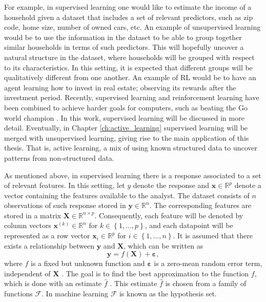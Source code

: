 For example, in supervised learning one would like to estimate the income of a household given a dataset that includes a set of relevant predictors, such as zip code, home size, number of owned cars, etc.
An example of unsupervised learning would be to use the information in the dataset to be able to group together similar households in terms of such predictors. This will hopefully uncover a natural structure in the dataset, where households will be grouped with respect to its characteristics. In this setting, it is expected that different groups will be qualitatively different from one another.
An example of RL would be to have an agent learning how to invest in real estate; observing its rewards after the investment period.
Recently, supervised learning and reinforcement learning have been combined to achieve harder goals for computers, such as beating the Go world champion \cite{silver2017mastering}.
In this work, supervised learning will be discussed in more detail. Eventually, in Chapter \ref{ch:active_learning} supervised learning will be merged with unsupervised learning, giving rise to the main application of this thesis. That is, active learning, a mix of using known structured data to uncover patterns from non-structured data.

As mentioned above, in supervised learning there is a response associated to a set of relevant features. In this setting, let $y$ denote the response
and $\boldsymbol{x} \in \mathbb{R}^p$ denote a vector containing the features available to the analyst. The dataset consists of $n$ observations of such response stored in $\boldsymbol{y} \in \mathbb{R}^n$.
The corresponding features are stored in a matrix $\boldsymbol{X} \in \mathbb{R}^{n \times p}$. Consequently, each feature will be denoted by column vectors $\boldsymbol{x}^{(k)} \in \mathbb{R}^n$ for $k \in \left\{1, \hdots, p \right\}$, and each datapoint will be represented as a row vector $\boldsymbol{x}_i \in \mathbb{R}^p$ for $i \in \left\{1, \hdots, n \right\}$.
It is assumed that there exists a relationship between $\boldsymbol{y}$ and $\boldsymbol{X}$, which can be written as
\begin{equation}
  \label{eq:general_learning_model}
  \boldsymbol{y} = f(\boldsymbol{X}) + \boldsymbol{\varepsilon},
\end{equation}
where $f$ is a fixed but unknown function and $\boldsymbol{\varepsilon}$ is a zero-mean random error term, independent of $\boldsymbol{X}$ \cite[p.~16]{james2013introduction}.
The goal is to find the best approximation to the function $f$, which is done with an estimate $\hat{f}$ \cite[p.~17]{james2013introduction}.
This estimate $\hat{f}$ is chosen from a family of functions $\mathcal{F}$. In machine learning $\mathcal{F}$ is known as the hypothesis set.

